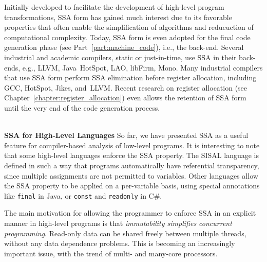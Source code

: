 

Initially developed to facilitate the development of high-level
program transformations, SSA form has gained much interest due to its
favorable properties that often
enable the simplification of algorithms and reducuction of computational complexity. 
Today, SSA form is even adopted for the final code generation phase (see Part~\ref{part:machine_code}), i.e., the back-end.
Several industrial and academic compilers, static or just-in-time, use SSA in their back-ends, e.g., LLVM, Java~HotSpot, LAO, libFirm, Mono.
Many industrial compilers that use SSA form perform SSA elimination before
register allocation, including  GCC, HotSpot, Jikes, and~LLVM.
Recent research on register allocation (see
Chapter~\ref{chapter:register_allocation}) even allows the retention of SSA form until the very end of the code generation process.

~\\
\textbf{SSA for High-Level Languages }
So far, we have presented SSA as a useful feature for 
compiler-based analysis of low-level programs.
It is interesting to note that some high-level languages enforce
the SSA property.
The SISAL language is defined in such a way that
programs automatically have referential transparency, since
multiple assignments are not permitted to variables.
Other languages allow the SSA property to be
applied on a per-variable basis, using special annotations
like
\texttt{final} in Java, or 
\texttt{const} and \texttt{readonly} in C\#.

The main motivation for allowing the programmer to enforce
SSA in an explicit manner in high-level programs is that
\textit{immutability simplifies concurrent programming}.
Read-only data can be shared freely between multiple threads,
without any data dependence problems.
This is becoming an increasingly important issue, with the
trend of multi- and many-core processors.

